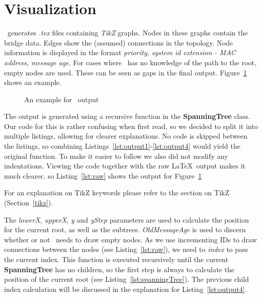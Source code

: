 \section{Visualization}
\tool\ generates \textit{.tex} files containing \textit{TikZ} graphs.
Nodes in these graphs contain the bridge data.
Edges show the (assumed) connections in the topology.
Node information is displayed in the format \textit{priority, system id extension - MAC address, message age}.
For cases where \tool\ has no knowledge of the path to the root, empty nodes are used.
These can be seen as gaps in the final output.
Figure~\ref{fig:viz_example} shows an example.
\begin{figure}[h]
    \centering
    \caption{An example for \tool\ output}
    \label{fig:viz_example}
\end{figure}

The output is generated using a recursive function in the \textbf{SpanningTree} class.
Our code for this is rather confusing when first read, so we decided to split it into multiple listings, allowing for clearer explanations.
No code is skipped between the listings, so combining Listings~\ref{lst:output1}-\ref{lst:output4} would yield the original function.
To make it easier to follow we also did not modify any indentations.
Viewing the code together with the raw \LaTeX\ output makes it much clearer, so Listing~\ref{lst:raw} shows the output for Figure~\ref{fig:viz_example}

For an explanation on TikZ keywords please refer to the section on TikZ (Section~\ref{tikz}).


The \textit{lowerX}, \textit{upperX}, \textit{y} and \textit{yStep} parameters are used to calculate the position for the current root, as well as the subtrees.
\textit{OldMessageAge} is used to discern whether or not \tool\ needs to draw empty nodes.
As we use incrementing IDs to draw connections between the nodes (see Listing~\ref{lst:raw}), we need to \textit{index} to pass the current index.
This function is executed recursively until the current \textbf{SpanningTree} has no children, so the first step is always to calculate the position of the current root (see Listing~\ref{lst:spanningTree}).
The previous child index calculation will be discussed in the explanation for Listing~\ref{lst:output4}.

